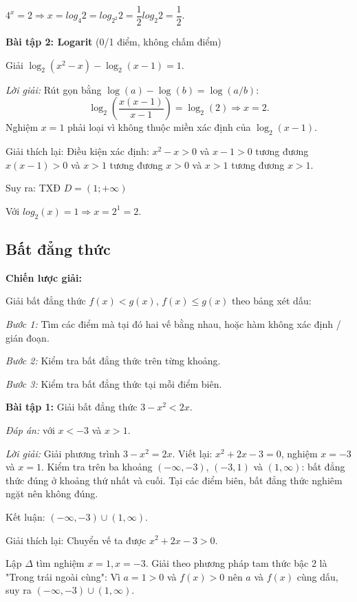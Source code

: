 \documentclass[12pt,a4paper]{article}
\begin{document}
$4^x = 2 \Rightarrow x = log_4{2} = log_{2^2}{2} = \dfrac{1}{2}log_2{2} = \dfrac{1}{2}$.

\textbf{Bài tập 2: Logarit} (0/1 điểm, không chấm điểm)

Giải $\log_2(x^2 - x) - \log_2(x-1) = 1$.

\textit{Lời giải:} Rút gọn bằng $\log(a) - \log(b) = \log(a/b)$:
\[
\log_2\!\left(\dfrac{x(x-1)}{x-1}\right) = \log_2(2) \Rightarrow x = 2.
\]
Nghiệm $x = 1$ phải loại vì không thuộc miền xác định của $\log_2(x-1)$.

Giải thích lại: Điều kiện xác định: $x^2 - x > 0$ và $x - 1 > 0$ tương đương $x(x - 1) > 0$ và $x > 1$ tương đương $x > 0$ và $x > 1$ tương đương $x > 1$.

Suy ra: TXĐ $D = (1; +\infty)$

Với $log_2(x) = 1 \Rightarrow x = 2^1 = 2$.

\subsection{Bất đẳng thức}

\textbf{Chiến lược giải:}

Giải bất đẳng thức $f(x) < g(x)$, $f(x) \le g(x)$ theo bảng xét dấu:

\textit{Bước 1:} Tìm các điểm mà tại đó hai vế bằng nhau, hoặc hàm không xác định / gián đoạn.

\textit{Bước 2:} Kiểm tra bất đẳng thức trên từng khoảng.

\textit{Bước 3:} Kiểm tra bất đẳng thức tại mỗi điểm biên.

\bigskip

\textbf{Bài tập 1:} Giải bất đẳng thức $3 - x^2 < 2x$.

\textit{Đáp án:} với $x < -3$ và $x > 1$.

\textit{Lời giải:} Giải phương trình $3 - x^2 = 2x$. Viết lại: $x^2 + 2x - 3 = 0$, nghiệm $x = -3$ và $x = 1$. Kiểm tra trên ba khoảng $(-\infty,-3)$, $(-3,1)$ và $(1,\infty)$: bất đẳng thức đúng ở khoảng thứ nhất và cuối. Tại các điểm biên, bất đẳng thức nghiêm ngặt nên không đúng.

Kết luận: $(-\infty,-3) \cup (1,\infty)$.

Giải thích lại: Chuyển vế ta được $x^2 + 2x - 3 > 0$.

Lập $\Delta$ tìm nghiệm $x = 1, x = -3$. Giải theo phương pháp tam thức bậc 2 là "Trong trái ngoài cùng": Vì $a = 1 > 0$ và $f(x) > 0$ nên $a$ và $f(x)$ cùng dấu, suy ra $(-\infty,-3) \cup (1,\infty)$.
\end{document}
